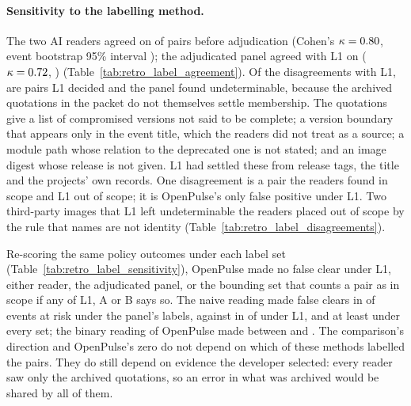 \documentclass[11pt]{article}
\begin{document}
\paragraph{Sensitivity to the labelling method.} The two AI readers agreed on
\LabAgreeAB{} of \RetroPairs{} pairs before adjudication (Cohen's
$\kappa=0.80{}$, event bootstrap 95\% interval \LabKappaABci{}); the
adjudicated panel agreed with L1 on \LabAgreeAPLone{} ($\kappa=0.72{}$,
\LabKappaAPLoneci{}) (Table~\ref{tab:retro_label_agreement}). Of the
\LabDisagreeAPLone{} disagreements with L1, \LabDecidedToUnd{} are pairs L1
decided and the panel found undeterminable, because the archived quotations
in the packet do not themselves settle membership. The quotations give a list
of compromised versions not said to be complete; a version boundary that
appears only in the event title, which the readers did not treat as a source;
a module path whose relation to the deprecated one is not stated; and an
image digest whose release is not given. L1 had settled these from release
tags, the title and the projects' own records. One disagreement is a pair the
readers found in scope and L1 out of scope; it is OpenPulse's only false
positive under L1. Two third-party images that L1 left undeterminable the
readers placed out of scope by the rule that names are not identity
(Table~\ref{tab:retro_label_disagreements}).

Re-scoring the same policy outcomes under each label set
(Table~\ref{tab:retro_label_sensitivity}), OpenPulse made no false clear under
L1, either reader, the adjudicated panel, or the bounding set that counts a
pair as in scope if any of L1, A or B says so. The naive reading made
\LabFCaAP{} false clears in \LabFCaEvAP{} of \LabAtRiskAP{} events at risk
under the panel's labels, against \FCa{} in \FCaEvents{} of \EventsAtRisk{}
under L1, and at least \LabFCaBoundA{} under every set; the binary reading of
OpenPulse made between \LabFCbinAP{} and \FCbinary{}. The comparison's direction and
OpenPulse's zero do not depend on which of these methods labelled the pairs.
They do still depend on evidence the developer selected: every reader saw only
the archived quotations, so an error in what was archived would be shared by
all of them.






\end{document}
